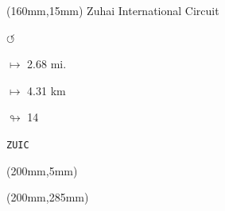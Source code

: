 \begin{textblock*}{40mm}(160mm,15mm)%
Zuhai International Circuit
\par \Huge$\circlearrowleft$
\Large
\par$\mapsto$ 2.68 mi.
\par$\mapsto$ 4.31 km
\par$\looparrowright$ 14
\par\hfill\tiny\tt ZUIC\\
\end{textblock*}
\begin{textblock*}{20mm}(200mm,5mm)%
\fbox{\thepage}
\end{textblock*}
\begin{textblock*}{20mm}(200mm,285mm)%
\fbox{\thepage}
\end{textblock*}

